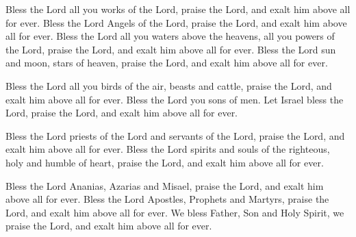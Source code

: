 \documentclass{article}
\begin{document}
\begin{service}
\begin{multicols}{2}
{			Bless the Lord all you works of the Lord, praise the Lord, and exalt him
			above all for ever. Bless the Lord Angels of the Lord, praise the Lord,
			and exalt him above all for ever. Bless the Lord all you waters above the
			heavens, all you powers of the Lord, praise the Lord, and exalt him above
			all for ever. Bless the Lord sun and moon, stars of heaven, praise the Lord,
			and exalt him above all for ever.
			\item Bless the Lord all you birds of the air, beasts and cattle, praise the
			Lord, and exalt him above all for ever. Bless the Lord you sons of men. Let
			Israel bless the Lord, praise the Lord, and exalt him above all for ever.
			\item Bless the Lord priests of the Lord and servants of the Lord, praise
			the Lord, and exalt him above all for ever. Bless the Lord spirits and souls
			of the righteous, holy and humble of heart, praise the Lord, and exalt him
			above all for ever.
			\item  Bless the Lord Ananias, Azarias and Misael, praise the Lord, and exalt
			him above all for ever. Bless the Lord Apostles, Prophets and Martyrs, praise
			the Lord, and exalt him above all for ever. We bless Father, Son and Holy
			Spirit, we praise the Lord, and exalt him above all for ever.
		}
	\end{multicols}
	\pagebreak
	\vspace{2em}
	\vspace{1em}
\end{service}
\end{document}
